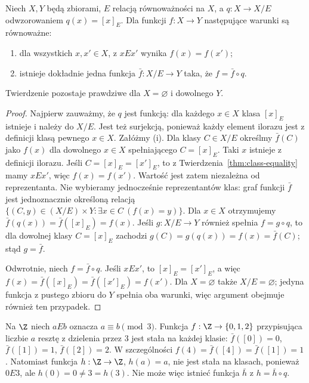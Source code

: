 \begin{twierdzenie}
\label{thm:lxv-quotient-factorization}
Niech $X,Y$ będą zbiorami, $E$ relacją równoważności na $X$,
a $q:X\to X/{E}$ odwzorowaniem $q(x)=[x]_E$.
Dla funkcji $f:X\to Y$ następujące warunki są równoważne:
\begin{enumerate}[label=(\roman*)]
\item dla wszystkich $x,x'\in X$, z $xEx'$ wynika $f(x)=f(x')$;
\item istnieje dokładnie jedna funkcja $\bar f:X/{E}\to Y$
taka, że $f=\bar f\circ q$.
\end{enumerate}
Twierdzenie pozostaje prawdziwe dla $X=\varnothing$ i dowolnego $Y$.
\end{twierdzenie}
\begin{proof}
Najpierw zauważmy, że $q$ jest funkcją: dla każdego $x\in X$
klasa $[x]_E$ istnieje i należy do $X/{E}$. Jest też surjekcją,
ponieważ każdy element ilorazu jest z definicji klasą pewnego $x\in X$.
Załóżmy (i). Dla klasy $C\in X/{E}$ określmy $\bar f(C)$ jako
$f(x)$ dla dowolnego $x\in X$ spełniającego $C=[x]_E$.
Taki $x$ istnieje z definicji ilorazu. Jeśli $C=[x]_E=[x']_E$,
to z Twierdzenia~\ref{thm:class-equality} mamy $xEx'$, więc
$f(x)=f(x')$. Wartość jest zatem niezależna od reprezentanta.
Nie wybieramy jednocześnie reprezentantów klas: graf funkcji
$\bar f$ jest jednoznacznie określoną relacją
$\{(C,y)\in(X/{E})\times Y:\exists x\in C\ (f(x)=y)\}$.
Dla $x\in X$ otrzymujemy $\bar f(q(x))=\bar f([x]_E)=f(x)$.
Jeśli $g:X/{E}\to Y$ również spełnia $f=g\circ q$,
to dla dowolnej klasy $C=[x]_E$ zachodzi
$g(C)=g(q(x))=f(x)=\bar f(C)$; stąd $g=\bar f$.

Odwrotnie, niech $f=\bar f\circ q$. Jeśli $xEx'$, to
$[x]_E=[x']_E$, a więc
$f(x)=\bar f([x]_E)=\bar f([x']_E)=f(x')$.
Dla $X=\varnothing$ także $X/{E}=\varnothing$;
jedyna funkcja z pustego zbioru do $Y$ spełnia oba warunki,
więc argument obejmuje również ten przypadek.
\end{proof}
\begin{przyklad}
\label{ex:lxv-quotient-factorization}
Na $\Z$ niech $aEb$ oznacza $a\equiv b\pmod 3$.
Funkcja $f:\Z\to\{0,1,2\}$ przypisująca liczbie $a$ resztę
z dzielenia przez $3$ jest stała na każdej klasie:
$\bar f([0])=0$, $\bar f([1])=1$, $\bar f([2])=2$.
W szczególności $f(4)=\bar f([4])=\bar f([1])=1$.
Natomiast funkcja $h:\Z\to\Z$, $h(a)=a$, nie jest stała na klasach,
ponieważ $0E3$, ale $h(0)=0\ne3=h(3)$.
Nie może więc istnieć funkcja $\bar h$ z $h=\bar h\circ q$.
\end{przyklad}

